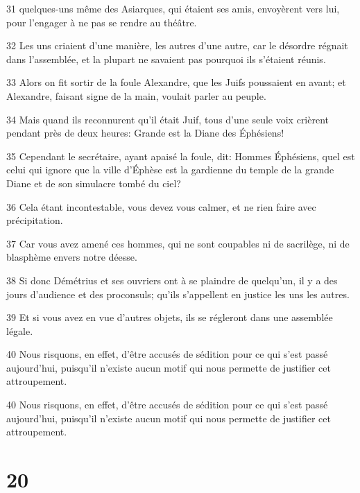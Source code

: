 \par 31 quelques-uns même des Asiarques, qui étaient ses amis, envoyèrent vers lui, pour l'engager à ne pas se rendre au théâtre.
\par 32 Les uns criaient d'une manière, les autres d'une autre, car le désordre régnait dans l'assemblée, et la plupart ne savaient pas pourquoi ils s'étaient réunis.
\par 33 Alors on fit sortir de la foule Alexandre, que les Juifs poussaient en avant; et Alexandre, faisant signe de la main, voulait parler au peuple.
\par 34 Mais quand ils reconnurent qu'il était Juif, tous d'une seule voix crièrent pendant près de deux heures: Grande est la Diane des Éphésiens!
\par 35 Cependant le secrétaire, ayant apaisé la foule, dit: Hommes Éphésiens, quel est celui qui ignore que la ville d'Éphèse est la gardienne du temple de la grande Diane et de son simulacre tombé du ciel?
\par 36 Cela étant incontestable, vous devez vous calmer, et ne rien faire avec précipitation.
\par 37 Car vous avez amené ces hommes, qui ne sont coupables ni de sacrilège, ni de blasphème envers notre déesse.
\par 38 Si donc Démétrius et ses ouvriers ont à se plaindre de quelqu'un, il y a des jours d'audience et des proconsuls; qu'ils s'appellent en justice les uns les autres.
\par 39 Et si vous avez en vue d'autres objets, ils se régleront dans une assemblée légale.
\par 40 Nous risquons, en effet, d'être accusés de sédition pour ce qui s'est passé aujourd'hui, puisqu'il n'existe aucun motif qui nous permette de justifier cet attroupement.
\par 40 Nous risquons, en effet, d'être accusés de sédition pour ce qui s'est passé aujourd'hui, puisqu'il n'existe aucun motif qui nous permette de justifier cet attroupement.

\chapter{20}

